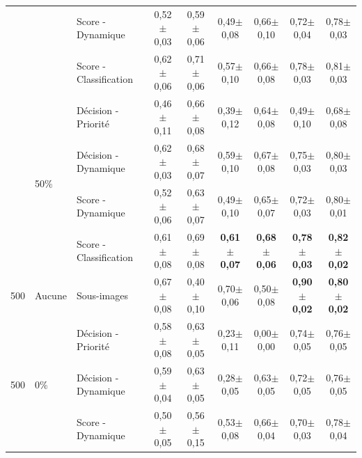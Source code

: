 \begin{landscape}
\begin{table}[p]
\begin{tabular}{lllcccccc}
							        &                               & Score - Dynamique         & 0,52$\pm$0,03         & 0,59$\pm$0,06         & 0,49$\pm$0,08         & 0,66$\pm$0,10         & 0,72$\pm$0,04         & 0,78$\pm$0,03         \\
							        &                               & Score - Classification    & 0,62$\pm$0,06         & 0,71$\pm$0,06         & 0,57$\pm$0,10         & 0,66$\pm$0,08         & 0,78$\pm$0,03         & 0,81$\pm$0,03         \\ \cline{2-9}
							        & \multirow{4}{*}{50\%}         & Décision - Priorité       & 0,46$\pm$0,11         & 0,66$\pm$0,08         & 0,39$\pm$0,12         & 0,64$\pm$0,08         & 0,49$\pm$0,10         & 0,68$\pm$0,08         \\
							        &                               & Décision - Dynamique      & 0,62$\pm$0,03         & 0,68$\pm$0,07         & 0,59$\pm$0,10         & 0,67$\pm$0,08         & 0,75$\pm$0,03         & 0,80$\pm$0,03         \\
							        &                               & Score - Dynamique         & 0,52$\pm$0,06         & 0,63$\pm$0,07         & 0,49$\pm$0,10         & 0,65$\pm$0,07         & 0,72$\pm$0,03         & 0,80$\pm$0,01         \\ \rowcolor[HTML]{E7E6E6}
		                            &                               & Score - Classification    & 0,61$\pm$0,08         & 0,69$\pm$0,08         & \textbf{0,61$\pm$0,07}& \textbf{0,68$\pm$0,06}& \textbf{0,78$\pm$0,03}& \textbf{0,82$\pm$0,02}\\ \midrule
		500                         & Aucune                        & Sous-images               & 0,67$\pm$0,08         & 0,40$\pm$0,10         & 0,70$\pm$0,06         & 0,50$\pm$0,08         & \textbf{0,90$\pm$0,02}& \textbf{0,80$\pm$0,02}\\ \midrule
		\multirow{12}{*}{500}       & \multirow{4}{*}{0\%}          & Décision - Priorité       & 0,58$\pm$0,08         & 0,63$\pm$0,05         & 0,23$\pm$0,11         & 0,00$\pm$0,00         & 0,74$\pm$0,05         & 0,76$\pm$0,05         \\
							        &                               & Décision - Dynamique      & 0,59$\pm$0,04         & 0,63$\pm$0,05         & 0,28$\pm$0,05         & 0,63$\pm$0,05         & 0,72$\pm$0,05         & 0,76$\pm$0,05         \\
							        &                               & Score - Dynamique         & 0,50$\pm$0,05         & 0,56$\pm$0,15         & 0,53$\pm$0,08         & 0,66$\pm$0,04         & 0,70$\pm$0,03         & 0,78$\pm$0,04         \\

\end{tabular}
\end{table}
\end{landscape}
